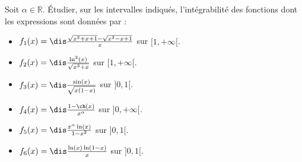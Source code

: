 \documentclass[a4paper,10pt]{report}
\begin{document}
\medskip

\begin{Exa} Soit $\alpha \in \mathbb{R}$. Étudier, sur les intervalles indiqués, l'int\'egrabilit\'e des fonctions dont les expressions sont données par :
\begin{multicols}{2}
\begin{itemize}
\item $f_1(x)=\dis\frac{\sqrt{x^2+x+1}-\sqrt{x^2-x+1}}{x}$ sur \newline $[1,+\infty[$.
\item $f_2(x)=\dis\frac{\ln^2(x)}{\sqrt{x^3+x}}$ sur $[1,+\infty[$.
\item $f_3(x)=\dis\frac{\sin(x)}{\sqrt{x(1-x)}}$ sur $]0,1[$.
\columnbreak
\item $f_4(x)=\dis\frac{1-\ch(x)}{x^{\alpha}}$ sur $]0,+\infty[$.
\item $f_5(x)=\dis\frac{x^{\alpha}\ln(x)}{1-x^2}$ sur $]0,1[$.
\item $f_6(x)=\dis\frac{\ln(x)\ln(1-x)}{x}$ sur $]0,1[$.
\end{itemize}
\end{multicols}

\vspace{0.1cm}
\end{Exa}

\corr 
\end{document}
